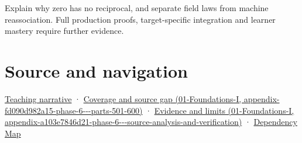 Explain why zero has no reciprocal, and separate field laws from machine reassociation. Full production proofs, target-specific integration and learner mastery require further evidence.

\section{Source and navigation}\label{appendix-52051ad550fe-source-and-navigation}

\href{Continuous\%20Notes/Computing\%20Foundations\%20-\%20From\%20Bits\%20to\%20C++\%20and\%20Systems\%20APIs\#Numbers\%20become\%20a\%20system\%20of\%20permitted\%20operations}{Teaching narrative} · \href{../01-Foundations-I/main.pdf\#nameddest=appendix-fd090d982a15-phase-6---parts-501-600}{Coverage and source gap (01-Foundations-I, appendix-fd090d982a15-phase-6-\/-\/-parts-501-600)} · \href{../01-Foundations-I/main.pdf\#nameddest=appendix-a103e7846d21-phase-6---source-analysis-and-verification}{Evidence and limits (01-Foundations-I, appendix-a103e7846d21-phase-6-\/-\/-source-analysis-and-verification)} · \hyperref[appendix-4ad47bdd269a]{Dependency Map}
